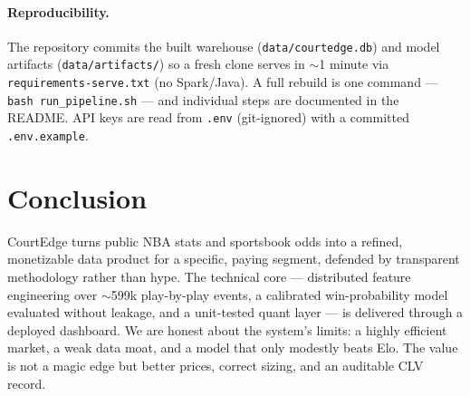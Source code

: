 \documentclass[12pt]{article}
\begin{document}
\paragraph{Reproducibility.} The repository commits the built warehouse
(\texttt{data/courtedge.db}) and model artifacts (\texttt{data/artifacts/}) so a fresh clone
serves in $\sim$1 minute via \texttt{requirements-serve.txt} (no Spark/Java). A full rebuild is
one command --- \texttt{bash run\_pipeline.sh} --- and individual steps are documented in the
README. API keys are read from \texttt{.env} (git-ignored) with a committed \texttt{.env.example}.

\section{Conclusion}
CourtEdge turns public NBA stats and sportsbook odds into a refined, monetizable data product
for a specific, paying segment, defended by transparent methodology rather than hype. The
technical core --- distributed feature engineering over $\sim$599k play-by-play events, a
calibrated win-probability model evaluated without leakage, and a unit-tested quant layer ---
is delivered through a deployed dashboard. We are honest about the system's limits: a highly
efficient market, a weak data moat, and a model that only modestly beats Elo. The value is not
a magic edge but better prices, correct sizing, and an auditable CLV record.
\end{document}
